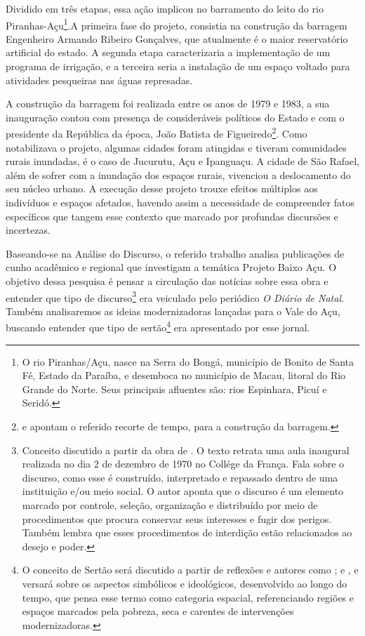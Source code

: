 \begin{refsection}
    Dividido em três etapas, essa ação implicou no barramento do leito do rio Piranhas-Açu\footnote{O rio Piranhas/Açu, nasce na Serra do Bongá, município de Bonito de Santa Fé, Estado da Paraíba, e desemboca no município de Macau, litoral do Rio Grande do Norte.  Seus principais afluentes são: rios Espinhara, Picuí e Seridó. }.A primeira fase do projeto, consistia na construção da barragem Engenheiro Armando Ribeiro Gonçalves, que atualmente é o maior reservatório artificial do estado. A segunda etapa caracterizaria a implementação de um programa de irrigação, e a terceira seria a instalação de um espaço voltado para atividades pesqueiras nas águas represadas. 

    A construção da barragem foi realizada entre os anos de 1979 e 1983, a sua inauguração contou com presença de consideráveis políticos do Estado e com o presidente da República da época, João Batista de Figueiredo\footnote{\textcite{Souza2011Teias} e \textcite{Pinheiro2018Vale} apontam o referido recorte de tempo, para a construção da barragem.}. Como notabilizava o projeto, algumas cidades foram atingidas e tiveram comunidades rurais inundadas, é o caso de Jucurutu, Açu e Ipanguaçu. A cidade de São Rafael, além de sofrer com a inundação dos espaços rurais, vivenciou a deslocamento do seu núcleo urbano. A execução desse projeto trouxe efeitos múltiplos aos indivíduos e espaços afetados, havendo assim a necessidade de compreender fatos específicos que tangem esse contexto que marcado por profundas discursões e incertezas.   

    Baseando-se na Análise do Discurso, o referido trabalho analisa publicações de cunho acadêmico e regional que investigam a temática Projeto Baixo Açu. O objetivo dessa pesquisa é pensar a circulação das notícias sobre essa obra e entender que tipo de discurso\footnote{Conceito discutido a partir da obra de \textcite{Foucault2002Ordem}. O texto retrata uma aula inaugural realizada no dia 2 de dezembro de 1970 no Collége da França. Fala sobre o discurso, como esse é construído, interpretado e repassado dentro de uma instituição e/ou meio social. O autor aponta que o discurso é um elemento marcado por controle, seleção, organização e distribuído por meio de procedimentos que procura conservar seus interesses e fugir dos perigos. Também lembra que esses procedimentos de interdição estão relacionados ao desejo e poder.} era veiculado pelo periódico \textit{O Diário de Natal}. Também analisaremos as ideias modernizadoras lançadas para o Vale do Açu, buscando entender que tipo de sertão\footnote{O conceito de Sertão será discutido a partir de reflexões e autores como \textcite{Amado1995Regiao}; \textcite{Moraes2003Sertao} e \textcite{Neves2003Sertao}, e versará sobre os aspectos simbólicos e ideológicos, desenvolvido ao longo do tempo, que pensa esse termo como categoria espacial, referenciando regiões e espaços marcados pela pobreza, seca e carentes de intervenções modernizadoras.} era apresentado por esse jornal.


\end{refsection}
